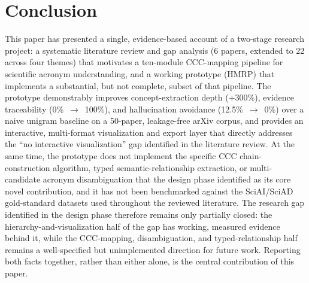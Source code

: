 \documentclass[10pt,conference]{IEEEtran}
\begin{document}
\section{Conclusion}
This paper has presented a single, evidence-based account of a two-stage research project: a systematic literature review and gap analysis (6 papers, extended to 22 across four themes) that motivates a ten-module CCC-mapping pipeline for scientific acronym understanding, and a working prototype (HMRP) that implements a substantial, but not complete, subset of that pipeline. The prototype demonstrably improves concept-extraction depth ($+$300\%), evidence traceability (0\%~$\rightarrow$~100\%), and hallucination avoidance (12.5\%~$\rightarrow$~0\%) over a naive unigram baseline on a 50-paper, leakage-free arXiv corpus, and provides an interactive, multi-format visualization and export layer that directly addresses the ``no interactive visualization'' gap identified in the literature review. At the same time, the prototype does not implement the specific CCC chain-construction algorithm, typed semantic-relationship extraction, or multi-candidate acronym disambiguation that the design phase identified as its core novel contribution, and it has not been benchmarked against the SciAI/SciAD gold-standard datasets used throughout the reviewed literature. The research gap identified in the design phase therefore remains only partially closed: the hierarchy-and-visualization half of the gap has working, measured evidence behind it, while the CCC-mapping, disambiguation, and typed-relationship half remains a well-specified but unimplemented direction for future work. Reporting both facts together, rather than either alone, is the central contribution of this paper.
\end{document}
